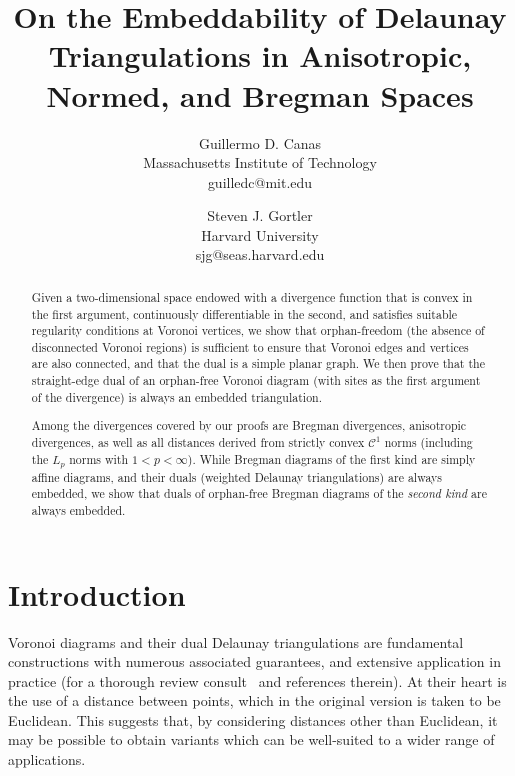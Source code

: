 \documentclass[11pt]{article}
\title{On the Embeddability of Delaunay Triangulations in Anisotropic, Normed, and Bregman Spaces}
\author{Guillermo D. Canas\\Massachusetts Institute of Technology\\guilledc@mit.edu
\and Steven J. Gortler\\Harvard University\\sjg@seas.harvard.edu}
\date{}
\begin{document}
\maketitle


\begin{abstract}






Given a two-dimensional space endowed with a divergence function that is convex in the first argument, 
	continuously differentiable in the second, 
	and satisfies suitable regularity conditions at Voronoi vertices, 
we show that orphan-freedom (the absence of disconnected Voronoi regions) is sufficient 
	to ensure that Voronoi edges and vertices are also connected, and 
	that the dual is a simple planar graph. 
We then prove that the straight-edge dual of an orphan-free Voronoi diagram 
		(with sites as the first argument of the divergence) is always an embedded triangulation. 






Among the divergences covered by our proofs are Bregman divergences, 
	anisotropic divergences, 
	as well as all distances derived from strictly convex $\mathcal{C}^1$  norms 
	(including the $L_p$ norms with $1< p < \infty$). 
While Bregman diagrams of the {first kind} are simply affine diagrams, 
	and their duals ({weighted} Delaunay triangulations) are always embedded, 
	we show that duals of orphan-free Bregman diagrams of the \emph{second kind} are always embedded. 	
	


\end{abstract}

\newpage

\section{Introduction}


Voronoi diagrams and their dual Delaunay triangulations are fundamental constructions with
numerous associated guarantees, and extensive application in
practice (for a thorough review consult~\cite{Aurenhammer13} and references therein).
At their heart is the use of a distance between points, which in the original
version is taken to be Euclidean. 
This suggests that, by considering 
distances other than Euclidean, 
it may be possible to obtain variants which can be well-suited to
a wider range of applications.  
\end{document}
